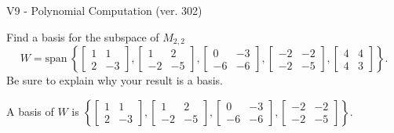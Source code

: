 \begin{exercise}
  \begin{exerciseTitle}V9 - Polynomial Computation (ver. 302)\end{exerciseTitle}
  \begin{exerciseStatement}
    Find a basis for the subspace of \(M_{2,2}\) 
\[W=\mathrm{span}\ \left\{\left[\begin{array}{cc}
1 & 1 \\
2 & -3
\end{array}\right] , \left[\begin{array}{cc}
1 & 2 \\
-2 & -5
\end{array}\right] , \left[\begin{array}{cc}
0 & -3 \\
-6 & -6
\end{array}\right] , \left[\begin{array}{cc}
-2 & -2 \\
-2 & -5
\end{array}\right] , \left[\begin{array}{cc}
4 & 4 \\
4 & 3
\end{array}\right]\right\}.\]
 Be sure to explain why your result is a basis.


  \end{exerciseStatement}
  \begin{exerciseAnswer}
   A basis of \(W\) is  \(\left\{\left[\begin{array}{cc}
1 & 1 \\
2 & -3
\end{array}\right] , \left[\begin{array}{cc}
1 & 2 \\
-2 & -5
\end{array}\right] , \left[\begin{array}{cc}
0 & -3 \\
-6 & -6
\end{array}\right] , \left[\begin{array}{cc}
-2 & -2 \\
-2 & -5
\end{array}\right]\right\}\).
  


  \end{exerciseAnswer}
\end{exercise}
